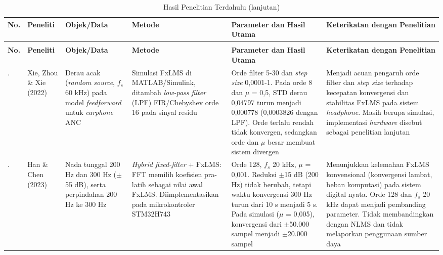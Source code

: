 \begingroup
\footnotesize
\setlength{\tabcolsep}{3pt}
\renewcommand{\arraystretch}{1.2}
\begin{longtable}{|>{\centering\arraybackslash}p{0.6cm}|>{\raggedright\arraybackslash}p{1.9cm}|>{\raggedright\arraybackslash}p{2.5cm}|>{\raggedright\arraybackslash}p{2.8cm}|>{\raggedright\arraybackslash}p{3.5cm}|>{\raggedright\arraybackslash}p{3.3cm}|}
  \caption{Hasil Penelitian Terdahulu}
  \label{tab:penelitian_terdahulu} \\
  \hline
  \textbf{No.} & \textbf{Peneliti} & \textbf{Objek/Data} & \textbf{Metode} & \textbf{Parameter dan Hasil Utama} & \textbf{Keterikatan dengan Penelitian} \\
  \hline
  \endfirsthead
  \caption[]{Hasil Penelitian Terdahulu (lanjutan)} \\
  \hline
  \textbf{No.} & \textbf{Peneliti} & \textbf{Objek/Data} & \textbf{Metode} & \textbf{Parameter dan Hasil Utama} & \textbf{Keterikatan dengan Penelitian} \\
  \hline
  \endhead
  1. & Xie, Zhou \& Xie (2022) & Derau acak (\emph{random source}, $f_s$ 60 kHz) pada model \emph{feedforward} untuk \emph{earphone} ANC & Simulasi FxLMS di MATLAB/Simulink, ditambah \emph{low-pass filter} (LPF) FIR/Chebyshev orde 16 pada sinyal residu & Orde filter 5-30 dan \emph{step size} 0,0001-1. Pada orde 8 dan $\mu$ = 0,5, STD derau 0,04797 turun menjadi 0,000778 (0,0003826 dengan LPF). Orde terlalu rendah tidak konvergen, sedangkan orde dan $\mu$ besar membuat sistem divergen & Menjadi acuan pengaruh orde filter dan \emph{step size} terhadap kecepatan konvergensi dan stabilitas FxLMS pada sistem \emph{headphone}. Masih berupa simulasi, implementasi \emph{hardware} disebut sebagai penelitian lanjutan \\
  \hline
  2. & Han \& Chen (2023) & Nada tunggal 200 Hz dan 300 Hz ($\pm$55 dB), serta perpindahan 200 Hz ke 300 Hz & \emph{Hybrid fixed-filter} + FxLMS: FFT memilih koefisien pra-latih sebagai nilai awal FxLMS. Diimplementasikan pada mikrokontroler STM32H743 & Orde 128, $f_s$ 20 kHz, $\mu$ = 0,001. Reduksi $\pm$15 dB (200 Hz) tidak berubah, tetapi waktu konvergensi 300 Hz turun dari 10 s menjadi 5 s. Pada simulasi ($\mu$ = 0,005), konvergensi dari $\pm$50.000 sampel menjadi $\pm$20.000 sampel & Menunjukkan kelemahan FxLMS konvensional (konvergensi lambat, beban komputasi) pada sistem digital nyata. Orde 128 dan $f_s$ 20 kHz dapat menjadi pembanding parameter. Tidak membandingkan dengan NLMS dan tidak melaporkan penggunaan sumber daya \\
  \hline

\end{longtable}
